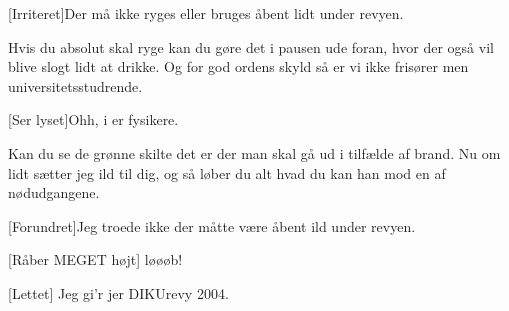 \documentclass[a4paper]{article}
\begin{document}
\begin{sketch}
  [Irriteret]Der må ikke ryges eller bruges åbent lidt under
  revyen.
  
  
  Hvis du absolut skal ryge kan du gøre det i pausen ude
  foran, hvor der også vil blive slogt lidt at drikke. Og for god
  ordens skyld så er vi ikke frisører men universitetsstudrende.
  
  [Ser lyset]Ohh, i er fysikere.
  
   Kan du se de
  grønne skilte det er der man skal gå ud i
  tilfælde af brand. Nu om lidt sætter jeg ild
  til dig, og så løber du alt hvad du kan han mod en af nødudgangene.
  
  [Forundret]Jeg troede ikke der måtte være åbent ild under
  revyen. 
  
  [Råber MEGET højt] løøøb!
  
  
  [Lettet] Jeg gi'r jer DIKUrevy 2004.
  
  
\end{sketch}
\end{document}
